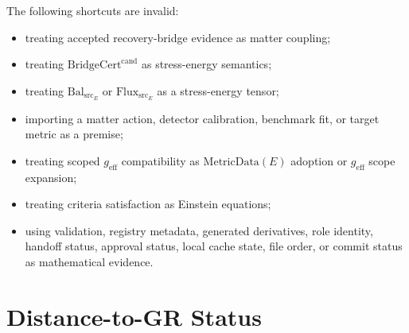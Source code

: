 \documentclass[11pt]{article}
\newcommand{\MetricData}{\mathrm{MetricData}}
\newcommand{\geff}{g_{\mathrm{eff}}}
\newcommand{\BridgeCertCand}{\mathrm{BridgeCert}^{\mathrm{cand}}}
\newcommand{\BalSrc}{\mathrm{Bal}_{\mathrm{src}}}
\newcommand{\FluxSrc}{\mathrm{Flux}_{\mathrm{src}}}
\begin{document}
The following shortcuts are invalid:
\begin{itemize}[leftmargin=*]
  \item treating accepted recovery-bridge evidence as matter coupling;
  \item treating \(\BridgeCertCand\) as stress-energy semantics;
  \item treating \(\BalSrc_E\) or \(\FluxSrc_E\) as a stress-energy tensor;
  \item importing a matter action, detector calibration, benchmark fit, or
  target metric as a premise;
  \item treating scoped \(\geff\) compatibility as \(\MetricData(E)\)
  adoption or \(\geff\) scope expansion;
  \item treating criteria satisfaction as Einstein equations;
  \item using validation, registry metadata, generated derivatives, role
  identity, handoff status, approval status, local cache state, file order, or
  commit status as mathematical evidence.
\end{itemize}

\section{Distance-to-GR Status}
\end{document}
